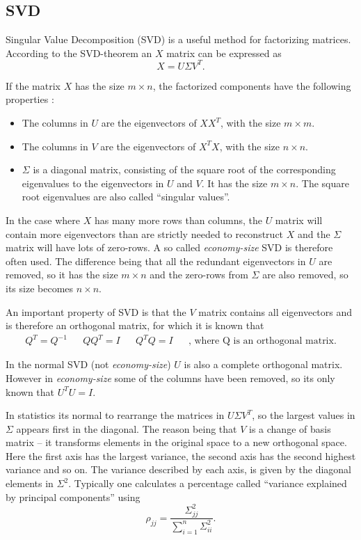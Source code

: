 \subsection{SVD}
Singular Value Decomposition (SVD) is a useful method for factorizing matrices. According to the SVD-theorem an $X$ matrix can be expressed as
\begin{equation}
X=U \Sigma V^{T}.
\label{eq:theory-svd}
\end{equation}

If the matrix $X$ has the size $m \times n$, the factorized components have the following properties \cite{introduction-to-data-mining}:
\begin{itemize}
\item The columns in $U$ are the eigenvectors of $X X^T$, with the size $m \times m$.
\item The columns in $V$ are the eigenvectors of $X^T X$, with the size $n \times n$.
\item $\Sigma$ is a diagonal matrix, consisting of the square root of the corresponding eigenvalues to the eigenvectors in $U$ and $V$.
It has the size $m \times n$. The square root eigenvalues are also called ``singular values''.
\end{itemize}

In the case where $X$ has many more rows than columns, the $U$ matrix will contain more eigenvectors than are strictly needed to reconstruct $X$ and the $\Sigma$ matrix will have lots of zero-rows.
A so called \textit{economy-size} SVD is therefore often used.
The difference being that all the redundant eigenvectors in $U$ are removed, so it has the size $m \times n$ and the zero-rows from $\Sigma$ are also removed, so its size becomes $n \times n$.

An important property of SVD is that the $V$ matrix contains all eigenvectors and is therefore an orthogonal matrix, for which it is known that
\begin{align}
Q^T = Q^{-1} && Q Q^T = I && Q^T Q = I && \text{, where Q is an orthogonal matrix.}
\end{align}

In the normal SVD (not \textit{economy-size}) $U$ is also a complete orthogonal matrix.
However in \textit{economy-size} some of the columns have been removed, so its only known that $U^T U = I$.

In statistics its normal to rearrange the matrices in $U \Sigma V^T$, so the largest values in $\Sigma$ appears first in the diagonal.
The reason being that $V$ is a change of basis matrix -- it transforms elements in the original space to a new orthogonal space.
Here the first axis has the largest variance, the second axis has the second highest variance and so on.
The variance described by each axis, is given by the diagonal elements in $\Sigma^2$.
Typically one calculates a percentage called ``variance explained by principal components'' using
\begin{equation}
\rho_{jj} = \frac{\Sigma^2_{jj}}{\sum_{i=1}^n \Sigma^2_{ii}}.
\end{equation}

